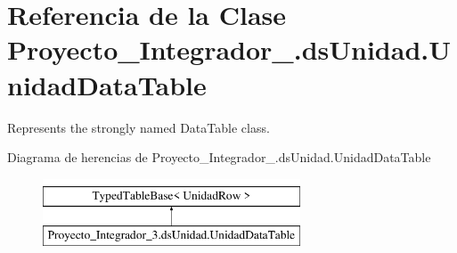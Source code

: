 \hypertarget{class_proyecto___integrador__3_1_1ds_unidad_1_1_unidad_data_table}{\section{Referencia de la Clase Proyecto\-\_\-\-Integrador\-\_.\-ds\-Unidad.\-Unidad\-Data\-Table}
\label{class_proyecto___integrador__3_1_1ds_unidad_1_1_unidad_data_table}
}


Represents the strongly named Data\-Table class.  


Diagrama de herencias de Proyecto\-\_\-\-Integrador\-\_.\-ds\-Unidad.\-Unidad\-Data\-Table\begin{figure}[H]
\begin{center}
\leavevmode
\includegraphics[height=2.000000cm]{dc/df4/class_proyecto___integrador__3_1_1ds_unidad_1_1_unidad_data_table}
\end{center}
\end{figure}
